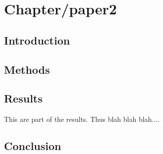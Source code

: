 \chapter{Chapter/paper2}

\section{Introduction}

\section{Methods}

\section{Results}

This are part of the results. Thus blah blah blah....

\section {Conclusion}


